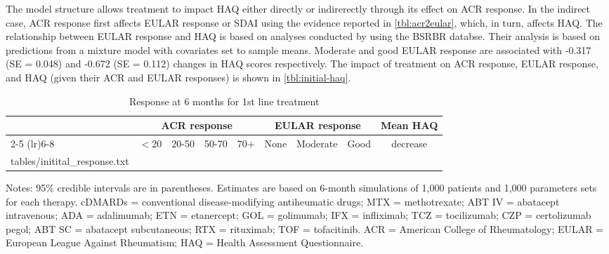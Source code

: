 \documentclass[11pt,final,fleqn]{article}\usepackage[]{graphicx}\usepackage[]{color}
\makeatletter
\theoremstyle{plain}
\newcommand*\ExpandableInput[1]{\@@input#1 }
\makeatother
\begin{document}
The model structure allows treatment to impact HAQ either directly or indirerectly through its effect on ACR response. In the indirect case, ACR response first affects EULAR response or SDAI using the evidence reported in \autoref{tbl:acr2eular}, which, in turn, affects HAQ. The relationship between EULAR response and HAQ is based on analyses conducted by \citet{stevenson2016adalimumab} using the BSRBR databse. Their analysis is based on predictions from a mixture model with covariates set to sample means. Moderate and good EULAR response are associated with -0.317 (SE = 0.048) and -0.672 (SE = 0.112) changes in HAQ scores respectively. The impact of treatment on ACR response, EULAR response, and HAQ (given their ACR and EULAR responses) is shown in \autoref{tbl:initial-haq}.



\begin{landscape}
\begin{table}[!ht]
\begin{center}
\begin{threeparttable}
\caption{Response at 6 months for 1st line treatment} \label{tbl:initial-haq}
\scriptsize
\begin{tabular}{lrrrrrrrr}
\hline
\multicolumn{1}{c}{} & \multicolumn{4}{c}{ACR response} & \multicolumn{3}{c}{EULAR response} & \multicolumn{1}{c}{\multirow{2}{*}{Mean HAQ}}\\
\cmidrule(lr){2-5} \cmidrule(lr){6-8}
\multicolumn{1}{l}{Treatment} & \multicolumn{1}{c}{$<$20} & \multicolumn{1}{c}{20-50} & \multicolumn{1}{c}{50-70}  & \multicolumn{1}{c}{70+}   & \multicolumn{1}{c}{None} & \multicolumn{1}{c}{Moderate}  & \multicolumn{1}{c}{Good}  & \multicolumn{1}{c}{decrease}\\
\hline
\ExpandableInput{tables/initital_response.txt}
\hline
\end{tabular}
\tiny
Notes: 95\% credible intervals are in parentheses. Estimates are based on 6-month simulations of 1,000 patients and 1,000 parameters sets for each therapy. cDMARDs = conventional disease-modifying antiheumatic drugs; MTX = methotrexate; ABT IV = abatacept intravenous; ADA = adalimumab; ETN = etanercept; GOL = golimumab; IFX = infliximab; TCZ = tocilizumab; CZP = certolizumab pegol; ABT SC = abatacept subcutaneous; RTX = rituximab; TOF = tofacitinib. ACR = American College of Rheumatology; EULAR = European League Against Rheumatism; HAQ = Health Assessment Questionnaire. 
\end{threeparttable}
\end{center}
\end{table}
\end{landscape}
\end{document}
